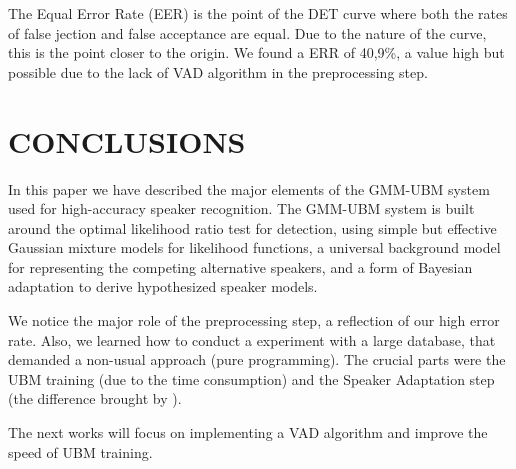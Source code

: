 \documentclass[a4paper,twocolumn]{article}
\begin{document}
\noindent The Equal Error Rate (EER) is the point of the DET curve where both the rates of false jection and false acceptance are equal. Due to the nature of the curve, this is the point closer to the origin. We found a ERR of 40,9\%, a value high but possible due to the lack of VAD algorithm in the preprocessing step.


\section{CONCLUSIONS}

In this paper we have described the major elements of the GMM-UBM system used for high-accuracy speaker recognition. The GMM-UBM system is built around the optimal likelihood ratio test for detection, using simple but effective Gaussian mixture models for likelihood functions, a universal background model for representing the competing alternative speakers, and a form of Bayesian adaptation to derive hypothesized speaker models.

We notice the major role of the preprocessing step, a reflection of our high error rate. Also, we learned how to conduct a experiment with a large database, that demanded a non-usual approach (pure programming). The crucial parts were the UBM training (due to the time consumption) and the Speaker Adaptation step (the difference brought by \cite{reynolds_et_al_2000}).

The next works will focus on implementing a VAD algorithm and improve the speed of UBM training.
\end{document}
